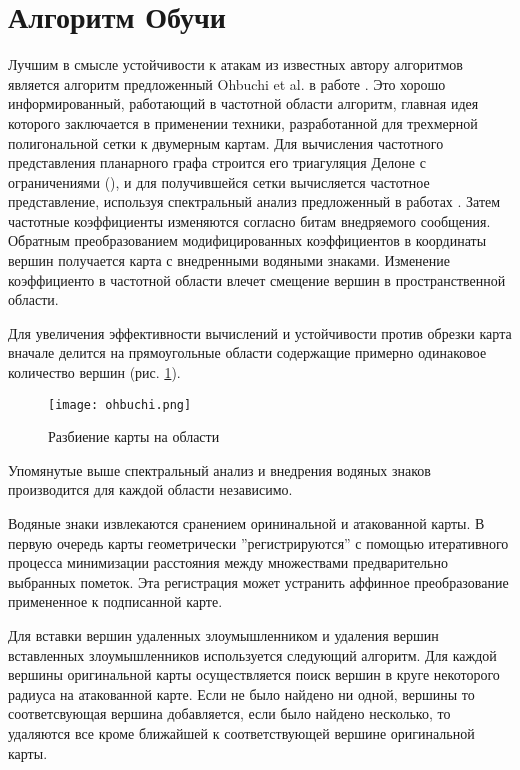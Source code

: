 \section{Алгоритм Обучи}
\label{sec:base}

Лучшим в смысле устойчивости к атакам из известных автору алгоритмов является алгоритм предложенный 
Ohbuchi et al. в работе \cite{Ohbuchi}. Это хорошо информированный, работающий в частотной области алгоритм,
главная идея которого заключается в применении техники, разработанной для трехмерной полигональной сетки к
двумерным картам.
Для вычисления частотного представления планарного графа строится его триагуляция Делоне с ограничениями 
(\cite{Chew}), и для получившейся сетки вычисляется частотное представление, используя спектральный анализ 
предложенный в работах \cite{Karni1, Karni2}. Затем частотные коэффициенты изменяются согласно битам 
внедряемого сообщения. Обратным преобразованием модифицированных коэффициентов в координаты вершин получается
карта с внедренными водяными знаками. Изменение коэффициенто в частотной области влечет смещение вершин в 
пространственной области.

Для увеличения эффективности вычислений и устойчивости против обрезки карта вначале делится на прямоугольные 
области содержащие примерно одинаковое количество вершин (рис. \ref{pic_ohbuchi}). 
\begin{figure}
  \centering
  \texttt{[image: ohbuchi.png]}
  \caption{Разбиение карты на области}
  \label{pic_ohbuchi}
\end{figure}
Упомянутые выше спектральный анализ и внедрения водяных знаков производится для каждой области независимо.

Водяные знаки извлекаются сранением орининальной и атакованной карты. В первую очередь карты геометрически
''регистрируются'' с помощью итеративного процесса минимизации расстояния между множествами предварительно
выбранных пометок. Эта регистрация может устранить аффинное преобразование примененное к подписанной карте.

Для вставки вершин удаленных злоумышленником и удаления вершин вставленных злоумышленников используется 
следующий алгоритм. Для каждой вершины оригинальной
карты осуществляется поиск вершин в круге некоторого радиуса на атакованной карте. Если не было найдено ни одной,
вершины то соответсвующая вершина добавляется, если было найдено несколько, то удаляются все кроме ближайшей
к соответствующей вершине оригинальной карты.

